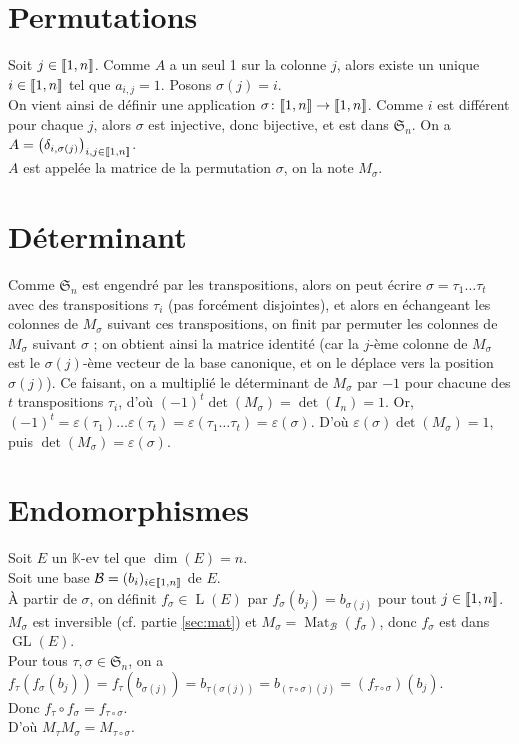 \documentclass[10pt,a4paper,french,landscape]{article}
\DeclarePairedDelimiter\parenlong{\lparen}{\rparen}
\newcommand{\paren}[1]{\parenlong*{#1}}
\DeclarePairedDelimiter\bracketlong{\llbracket}{\rrbracket}
\newcommand{\br}[1]{\bracketlong*{#1}}
\theoremstyle{definition}
\theoremstyle{remark}
\DeclareMathOperator{\GL}{GL}
\DeclareMathOperator{\LL}{L}
\DeclareMathOperator{\M}{Mat}
\newcommand{\KK}{\mathbb K}
\newcommand{\Sy}{\mathfrak{S}}
\newcommand{\1}{\mathbbm{1}}
\newcommand{\Sn}[1][n]{\Sy_{#1}}
\newcommand{\ba}[1]{\mathcal{#1}}
\begin{document}
\begin{multicols*}{2}
\section{Permutations}

Soit $j\in\br{1,n}$.
Comme $A$ a un seul 1 sur la colonne $j$, alors existe un unique $i\in\br{1,n}$ tel que $a_{i,j}=1$.
Posons $\sigma(j)=i$.\\

On vient ainsi de définir une application $\sigma\colon\br{1,n}\rightarrow\br{1,n}$.
Comme $i$ est différent pour chaque $j$, alors $\sigma$ est injective, donc bijective, et est dans $\Sn$.
On a $A=\paren{\delta_{i,\sigma(j)}}_{i,j\in\br{1,n}}$.\\
$A$ est appelée la matrice de la permutation $\sigma$, on la note $M_\sigma$.

\section{Déterminant}
\label{sec:det}

Comme $\Sn$ est engendré par les transpositions, alors on peut écrire $\sigma=\tau_1\dots\tau_t$ avec des transpositions $\tau_i$ (pas forcément disjointes), et alors en échangeant les colonnes de $M_\sigma$ suivant ces transpositions, on finit par permuter les colonnes de $M_\sigma$ suivant $\sigma$ ; on obtient ainsi la matrice identité (car la $j$-ème colonne de $M_\sigma$ est le $\sigma(j)$-ème vecteur de la base canonique, et on le déplace vers la position $\sigma(j)$). Ce faisant, on a multiplié le déterminant de $M_\sigma$ par $-1$ pour chacune des $t$ transpositions $\tau_i$, d'où $(-1)^t\det(M_\sigma)=\det(I_n)=1$. Or, $(-1)^t=\varepsilon(\tau_1)\dots\varepsilon(\tau_t)=\varepsilon(\tau_1\dots\tau_t)=\varepsilon(\sigma)$. D'où $\varepsilon(\sigma)\det(M_\sigma)=1$, puis $\det(M_\sigma)=\varepsilon(\sigma)$.

\section{Endomorphismes}
\label{sec:endo}

\noindent
Soit $E$ un $\KK$-ev tel que $\dim(E)=n$.\\
Soit une base $\ba{B}=(b_i)_{i\in\br{1,n}}$ de $E$.\\
À partir de $\sigma$, on définit $f_\sigma\in\LL(E)$ par $f_\sigma(b_j) = b_{\sigma(j)}$ pour tout $j\in\br{1,n}$.\\
$M_\sigma$ est inversible (cf. partie \ref{sec:mat}) et $M_\sigma=\M_\ba{B}(f_\sigma)$, donc $f_\sigma$ est dans $\GL(E)$.\\
Pour tous $\tau,\sigma\in\Sn$, on a $f_\tau(f_\sigma(b_j)) = f_\tau(b_{\sigma(j)}) = b_{\tau(\sigma(j))} = b_{(\tau\circ\sigma)(j)} = (f_{\tau\circ\sigma})(b_j)$.
\\
Donc $f_\tau\circ f_\sigma = f_{\tau\circ\sigma}$.\\ D'où $M_\tau M_\sigma = M_{\tau\circ\sigma}$.


\end{multicols*}
\end{document}
